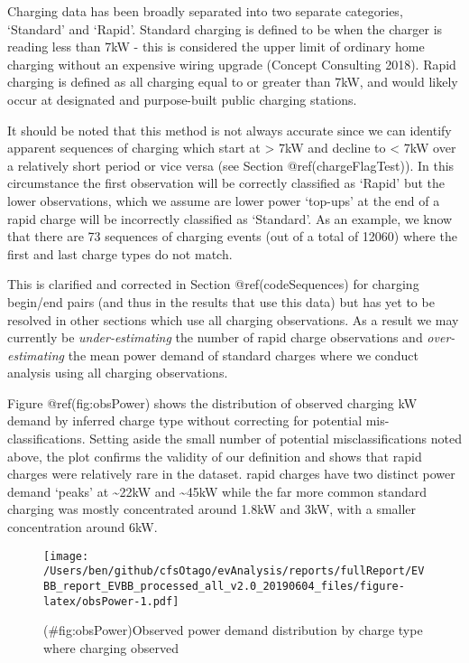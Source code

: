 \documentclass[]{article}
\begin{document}
Charging data has been broadly separated into two separate categories, `Standard' and `Rapid'. Standard charging is defined to be when the charger is reading less than 7kW - this is considered the upper limit of ordinary home charging without an expensive wiring upgrade (Concept Consulting 2018). Rapid charging is defined as all charging equal to or greater than 7kW, and would likely occur at designated and purpose-built public charging stations.

It should be noted that this method is not always accurate since we can identify apparent sequences of charging which start at \textgreater{} 7kW and decline to \textless{} 7kW over a relatively short period or vice versa (see Section @ref(chargeFlagTest)). In this circumstance the first observation will be correctly classified as `Rapid' but the lower observations, which we assume are lower power `top-ups' at the end of a rapid charge will be incorrectly classified as `Standard'. As an example, we know that there are 73 sequences of charging events (out of a total of 12060) where the first and last charge types do not match.

This is clarified and corrected in Section @ref(codeSequences) for charging begin/end pairs (and thus in the results that use this data) but has yet to be resolved in other sections which use all charging observations. As a result we may currently be \emph{under-estimating} the number of rapid charge observations and \emph{over-estimating} the mean power demand of standard charges where we conduct analysis using all charging observations.

Figure @ref(fig:obsPower) shows the distribution of observed charging kW demand by inferred charge type without correcting for potential mis-classifications. Setting aside the small number of potential misclassifications noted above, the plot confirms the validity of our definition and shows that rapid charges were relatively rare in the dataset. rapid charges have two distinct power demand `peaks' at \textasciitilde{}22kW and \textasciitilde{}45kW while the far more common standard charging was mostly concentrated around 1.8kW and 3kW, with a smaller concentration around 6kW.

\begin{figure}
\centering
\texttt{[image: /Users/ben/github/cfsOtago/evAnalysis/reports/fullReport/EVBB\_report\_EVBB\_processed\_all\_v2.0\_20190604\_files/figure-latex/obsPower-1.pdf]}
\caption{(\#fig:obsPower)Observed power demand distribution by charge type where charging observed}
\end{figure}
\end{document}
